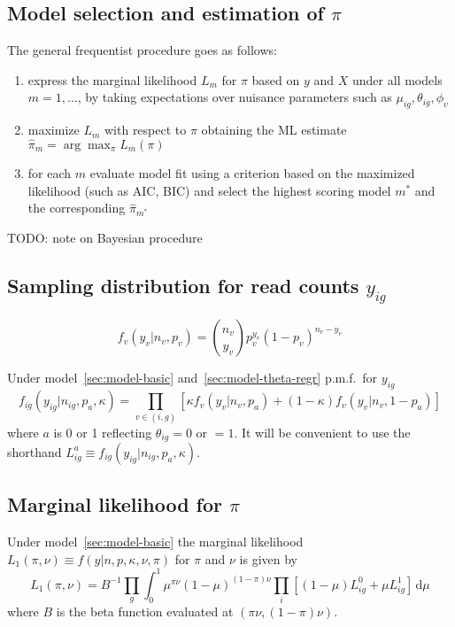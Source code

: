 \documentclass[letterpaper]{article}
\begin{document}
\subsection{Model selection and estimation of \(\pi\)}
\label{sec:marginal-likelihood-pi}

The general frequentist procedure goes as follows:
\begin{enumerate}
\item
express the marginal likelihood \(L_m\) for \(\pi\) based on \(y\)
and \(X\) under all models \(m=1,...\), by taking expectations over nuisance
parameters such as \(\mu_{ig},\theta_{ig},\phi_v\)
\item 
maximize \(L_m\) with respect to \(\pi\) obtaining the ML estimate
\(\hat{\pi}_m=\arg\max_\pi L_{m}(\pi)\)
\item for each \(m\) evaluate model fit using a criterion based on the
maximized likelihood (such as AIC, BIC) and select the highest scoring model
\(m^*\) and the corresponding \(\hat{\pi}_{m^*}\)
\end{enumerate}

TODO: note on Bayesian procedure

\subsection{Sampling distribution for read counts \(y_{ig}\)}

\begin{equation}
f_v(y_v | n_v, p_v) = \binom{n_v}{y_v} p_v^{y_v} (1-p_v)^{n_v-y_v}
\end{equation}

Under model~\ref{sec:model-basic} and~\ref{sec:model-theta-regr} p.m.f.~for \(y_{ig}\)
\begin{equation}
\label{eq:f-ig}
f_{ig}(y_{ig} | n_{ig}, p_a, \kappa) = \prod_{v\in(i,g)}
\left[
\kappa f_v(y_v | n_v, p_a) +
(1-\kappa) f_v(y_v | n_v, 1-p_a)
\right]
\end{equation}
where \(a\) is 0 or 1 reflecting \(\theta_{ig}=0\) or \(=1\).  It will be
convenient to use the shorthand \(L_{ig}^a\equiv f_{ig}(y_{ig} | n_{ig}, p_a,
\kappa)\).

\subsection{Marginal likelihood for \(\pi\)}

Under model~\ref{sec:model-basic} the marginal likelihood
\(L_1(\pi,\nu)\equiv
f(y|n,p,\kappa,\nu,\pi)\) for \(\pi\) and \(\nu\) is given by
\begin{equation}
\label{eq:L-model-basic}
L_1(\pi,\nu) = B^{-1} \prod_{g} \int_{0}^{1} \mu^{\pi\nu} (1-\mu)^{(1-\pi)\nu}
\prod_{i}
\left[
(1-\mu) L_{ig}^0 + \mu L_{ig}^1
\right]
\, \mathrm{d}\mu
\end{equation}
where \(B\) is the beta function evaluated at \((\pi\nu, (1-\pi)\nu)\).
\end{document}
